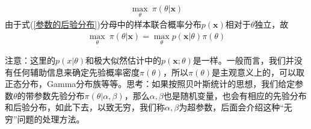         \begin{align*}
        \max _\theta \ \pi(\theta|\mathbf{x})
        \end{align*}
        由于式(\ref{参数的后验分布})分母中的样本联合概率分布$p(\mathbf{x})$相对于$\theta$独立，故
        \begin{align*}
        \max _\theta \ \pi(\theta|\mathbf{x}) = \max_\theta p(\mathbf{x}|\theta)\pi(\theta)
        \end{align*}
        \par
        注意：这里的$p(x|\theta)$和极大似然估计中的$p(\mathbf{x};\theta)$是一样。一般而言，我们并没有任何辅助信息来确定先验概率密度$\pi(\theta)$，所以$\pi(\theta)$是主观意义上的，可以取正态分布，Gamma分布族等等。思考：如果按照贝叶斯统计的思想，我们给定参数$\theta$的带参数先验分布$\pi(\theta|\alpha,\beta)$，那么$\alpha,\beta$也是随机变量，也会有相应的先验分布和后验分布，如此下去，以致无穷，我们称$\alpha,\beta$为超参数，后面会介绍这种“无穷”问题的处理方法。
